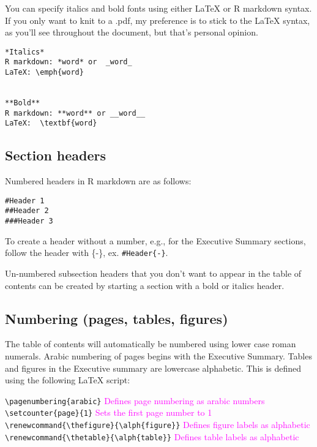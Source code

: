 \documentclass[12pt,]{article}
\begin{document}
You can specify italics and bold fonts using either LaTeX or R markdown
syntax. If you only want to knit to a .pdf, my preference is to stick to
the LaTeX syntax, as you'll see throughout the document, but that's
personal opinion.

\begin{Verbatim}[frame=single]
*Italics*  
R markdown: *word* or  _word_  
LaTeX: \emph{word}


**Bold**     
R markdown: **word** or __word__ 
LaTeX:  \textbf{word} 

\end{Verbatim}

\subsection{Section headers}\label{section-headers}

Numbered headers in R markdown are as follows:

\begin{Verbatim}[frame=single]
#Header 1  
##Header 2 
###Header 3
\end{Verbatim}

To create a header without a number, e.g., for the Executive Summary
sections, follow the header with \{-\}, ex. \texttt{\#Header\{-\}}.

Un-numbered subsection headers that you don't want to appear in the
table of contents can be created by starting a section with a bold or
italics header.

\subsection{Numbering (pages, tables,
figures)}\label{numbering-pages-tables-figures}

The table of contents will automatically be numbered using lower case
roman numerals. Arabic numbering of pages begins with the Executive
Summary. Tables and figures in the Executive summary are lowercase
alphabetic. This is defined using the following LaTeX script:

\texttt{\textbackslash{}pagenumbering\{arabic\}}
\textcolor{magenta}{Defines page numbering as arabic numbers}\\
\texttt{\textbackslash{}setcounter\{page\}\{1\}}
\textcolor{magenta}{Sets the first page number to 1}\\
\texttt{\textbackslash{}renewcommand\{\textbackslash{}thefigure\}\{\textbackslash{}alph\{figure\}\}}
\textcolor{magenta}{Defines figure labels as alphabetic}\\
\texttt{\textbackslash{}renewcommand\{\textbackslash{}thetable\}\{\textbackslash{}alph\{table\}\}}
\textcolor{magenta}{Defines table labels as alphabetic}
\end{document}
